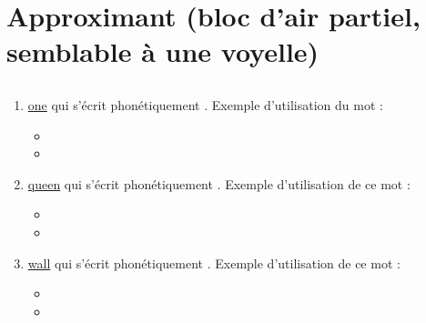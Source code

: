 \section{Approximant (bloc d'air partiel, semblable à une voyelle)}
\label{sec:approx}

\subsection{}\label{sec:w}

\begin{enumerate}
\item \href{http://www.wordreference.com/enfr/one}{one} qui s'écrit phonétiquement \href{https://en.oxforddictionaries.com/definition/one}{}. Exemple d'utilisation du
mot : 

\begin{itemize}
\item{}
\item{}
\end{itemize}

\item \href{http://www.wordreference.com/enfr/queen}{queen} qui s'écrit phonétiquement \href{https://en.oxforddictionaries.com/definition/queen}{}. Exemple d'utilisation de
ce mot :

\begin{itemize}
\item{}
\item{}
\end{itemize}

\item \href{http://www.wordreference.com/enfr/wall}{wall} qui s'écrit phonétiquement \href{https://en.oxforddictionaries.com/definition/wall}{}. Exemple d'utilisation de ce
mot : 

\begin{itemize}
\item{}
\item{}
\end{itemize}


\end{enumerate}
